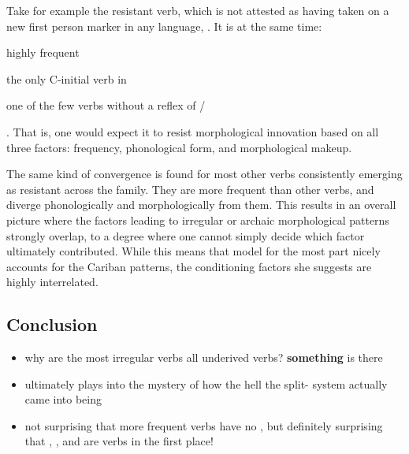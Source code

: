 

Take for example the  resistant verb, which is not attested as having taken on a new first person marker in any language,  .
It is at the same time: \begin{inlinelist}
	\item highly frequent
	\item the only C-initial  verb in \PC
	\item one of the few  verbs without a reflex of /
\end{inlinelist}.
That is, one would expect it to resist morphological innovation based on all three factors: frequency, phonological form, and morphological makeup.

The same kind of convergence is found for most other verbs consistently emerging as resistant across the family.
They are more frequent than other  verbs, and diverge phonologically and morphologically from them.
This results in an overall picture where the factors leading to irregular or archaic morphological patterns strongly overlap, to a degree where one cannot simply decide which factor ultimately contributed.
While this means that  model for the most part nicely accounts for the Cariban patterns, the conditioning factors she suggests are highly interrelated.

\subsection{Conclusion}

\begin{itemize}
	\item why are the most irregular verbs all underived  verbs? \textbf{something} is there
	\item ultimately plays into the mystery of how the hell the split- system actually came into being
	\item not surprising that more frequent  verbs have no , but definitely surprising that , , and  are  verbs in the first place!
\end{itemize}

